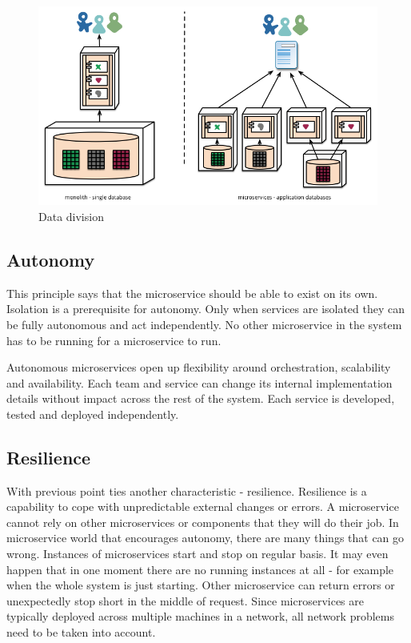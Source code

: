 \documentclass[12pt,oneside]{fithesis2}
\begin{document}
\begin{figure}[ht!]
	\label{decentralised_data}
	\centering
	\includegraphics[width=\textwidth]{images/decentralised_data.png}
	\caption{Data division \cite{mf}}
\end{figure}

\subsection{Autonomy}

This principle says that the microservice should be able to exist on its own. Isolation is a prerequisite for autonomy. Only when services are isolated they can be fully autonomous and act independently. No other microservice in the system has to be running for a microservice to run.

Autonomous microservices open up flexibility around orchestration, scalability and availability. Each team and service can change its internal implementation details without impact across the rest of the system. Each service is developed, tested and deployed independently.

\subsection{Resilience}

With previous point ties another characteristic - resilience. Resilience is a capability to cope with unpredictable external changes or errors. A microservice cannot rely on other microservices or components that they will do their job.
In microservice world that encourages autonomy, there are many things that can go wrong. Instances of microservices start and stop on regular basis. It may even happen that in one moment there are no running instances at all - for example when the whole system is just starting. Other microservice can return errors or unexpectedly stop short in the middle of request. Since microservices are typically deployed across multiple machines in a network, all network problems need to be taken into account.
\end{document}
